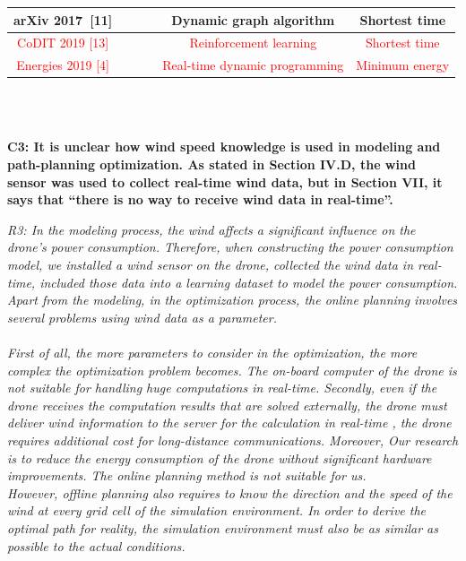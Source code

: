 \documentclass[onecolumn]{IEEEconf}
\newcommand{\cmark}{\ding{51}}%
\newcommand{\xmark}{\ding{55}}%
\begin{document}
\begin{description}
\begin{mdframed} [ linewidth=.75pt, userdefinedwidth=0.9\textwidth]
{\begin{tabular}{|c|c|c|c|c|c|}
    arXiv 2017~[11] & \cmark & \cmark & %
    & Dynamic graph algorithm & Shortest time \\ \hline
    \textcolor{red}{CoDIT 2019 {[13]}} &  &  & %
    & \textcolor{red}{Reinforcement learning} & \textcolor{red}{Shortest time} \\ \hline
    \textcolor{red}{Energies 2019 {[4]}} & \textcolor{red}{\cmark} & \textcolor{red}{\cmark} 
    & \textcolor{red}{\cmark} & \textcolor{red}{Real-time dynamic programming} & \textcolor{red}{Minimum energy} \\ \hline
    \end{tabular}
    }
    \end{mdframed} 
    ~\\	
    ~\\
    \item \textbf
    {
	C3: It is unclear how wind speed knowledge is used in modeling and path-planning optimization. As stated in Section IV.D, the wind sensor was used to collect real-time wind data, but in Section VII, it says that “there is no way to receive wind data in real-time”. 
	}
	\item \textit
	{
	R3: In the modeling process, the wind affects a significant influence on the drone’s power consumption. Therefore, when constructing the power consumption model, we installed a wind sensor on the drone, collected the wind data in real-time, included those data into a learning dataset to model the power consumption.
    Apart from the modeling, in the optimization process, the online planning involves several problems using wind data as a parameter.
    ~\\
    ~\\
    First of all, the more parameters to consider in the optimization, the more complex the optimization problem becomes. The on-board computer of the drone is not suitable for handling huge computations in real-time.
    Secondly, even if the drone receives the computation results that are solved externally, the drone must deliver wind information to the server for the calculation in real-time , the drone requires additional cost for long-distance communications. 
    Moreover, Our research is to reduce the energy consumption of the drone without significant hardware improvements. The online planning method is not suitable for us.~\\
    However, offline planning also requires to know the direction and the speed of the wind at every grid cell of the simulation environment. In order to derive the optimal path for reality, the simulation environment must also be as similar as possible to the actual conditions.
}
\end{description}
\end{document}
